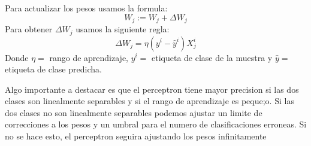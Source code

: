 \documentclass{article}
\begin{document}
Para actualizar los pesos usamos la formula:
\[
  W_j := W_j + \Delta W_j
\]
Para obtener \(\Delta W_j\) usamos la siguiente regla:
\[
  \Delta W_j = \eta(y^i - \hat{y}^i)X^i_j
\]
  Donde \(\eta =\) rango de aprendizaje, \(y^i =\) etiqueta de clase de la muestra y \(\hat{y} =\) etiqueta de clase predicha.

Algo importante a destacar es que el perceptron tiene mayor precision si las dos clases son linealmente separables y si el rango de aprendizaje es peque;o. Si las dos clases no son linealmente separables podemos ajustar
un limite de correcciones a los pesos y un umbral para el numero de clasificaciones erroneas. Si no se hace esto, el perceptron seguira ajustando los pesos infinitamente
  
\end{document}
